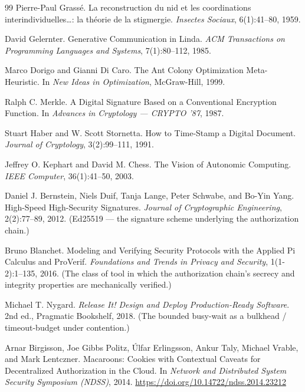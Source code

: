 \documentclass[11pt,a4paper]{article}
\theoremstyle{definition}
\theoremstyle{remark}
\begin{document}
\begin{thebibliography}{99}
Pierre-Paul Grass\'e.
\newblock La reconstruction du nid et les coordinations interindividuelles\ldots: la th\'eorie de la stigmergie.
\newblock \textit{Insectes Sociaux}, 6(1):41--80, 1959.

David Gelernter.
\newblock Generative Communication in Linda.
\newblock \textit{ACM Transactions on Programming Languages and Systems}, 7(1):80--112, 1985.

Marco Dorigo and Gianni Di Caro.
\newblock The Ant Colony Optimization Meta-Heuristic.
\newblock In \textit{New Ideas in Optimization}, McGraw-Hill, 1999.

Ralph C. Merkle.
\newblock A Digital Signature Based on a Conventional Encryption Function.
\newblock In \textit{Advances in Cryptology --- CRYPTO '87}, 1987.

Stuart Haber and W. Scott Stornetta.
\newblock How to Time-Stamp a Digital Document.
\newblock \textit{Journal of Cryptology}, 3(2):99--111, 1991.

Jeffrey O. Kephart and David M. Chess.
\newblock The Vision of Autonomic Computing.
\newblock \textit{IEEE Computer}, 36(1):41--50, 2003.

Daniel J. Bernstein, Niels Duif, Tanja Lange, Peter Schwabe, and Bo-Yin Yang.
\newblock High-Speed High-Security Signatures.
\newblock \textit{Journal of Cryptographic Engineering}, 2(2):77--89, 2012.
\newblock (Ed25519 --- the signature scheme underlying the authorization chain.)

Bruno Blanchet.
\newblock Modeling and Verifying Security Protocols with the Applied Pi Calculus and ProVerif.
\newblock \textit{Foundations and Trends in Privacy and Security}, 1(1-2):1--135, 2016.
\newblock (The class of tool in which the authorization chain's secrecy and integrity properties are mechanically verified.)

Michael T. Nygard.
\newblock \textit{Release It! Design and Deploy Production-Ready Software}.
\newblock 2nd ed., Pragmatic Bookshelf, 2018.
\newblock (The bounded busy-wait as a bulkhead / timeout-budget under contention.)

Arnar Birgisson, Joe Gibbs Politz, Úlfar Erlingsson, Ankur Taly, Michael Vrable, and Mark Lentczner.
\newblock Macaroons: Cookies with Contextual Caveats for Decentralized Authorization in the Cloud.
\newblock In \textit{Network and Distributed System Security Symposium (NDSS)}, 2014.
\newblock \url{https://doi.org/10.14722/ndss.2014.23212}


\end{thebibliography}
\end{document}
